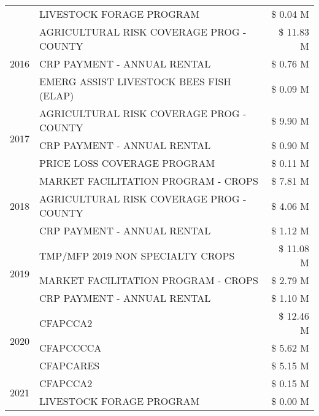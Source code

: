 \begin{tabular}{llr}
 & LIVESTOCK FORAGE PROGRAM & \$ 0.04 M \\
\cline{1-3}
\multirow[t]{3}{*}{2016} & AGRICULTURAL RISK COVERAGE PROG - COUNTY & \$ 11.83 M \\
 & CRP PAYMENT - ANNUAL RENTAL & \$ 0.76 M \\
 & EMERG ASSIST LIVESTOCK BEES FISH (ELAP) & \$ 0.09 M \\
\cline{1-3}
\multirow[t]{3}{*}{2017} & AGRICULTURAL RISK COVERAGE PROG - COUNTY & \$ 9.90 M \\
 & CRP PAYMENT - ANNUAL RENTAL & \$ 0.90 M \\
 & PRICE LOSS COVERAGE PROGRAM & \$ 0.11 M \\
\cline{1-3}
\multirow[t]{3}{*}{2018} & MARKET FACILITATION PROGRAM - CROPS & \$ 7.81 M \\
 & AGRICULTURAL RISK COVERAGE PROG - COUNTY & \$ 4.06 M \\
 & CRP PAYMENT - ANNUAL RENTAL & \$ 1.12 M \\
\cline{1-3}
\multirow[t]{3}{*}{2019} & TMP/MFP 2019 NON SPECIALTY CROPS & \$ 11.08 M \\
 & MARKET FACILITATION PROGRAM - CROPS & \$ 2.79 M \\
 & CRP PAYMENT - ANNUAL RENTAL & \$ 1.10 M \\
\cline{1-3}
\multirow[t]{3}{*}{2020} & CFAPCCA2 & \$ 12.46 M \\
 & CFAPCCCCA & \$ 5.62 M \\
 & CFAPCARES & \$ 5.15 M \\
\cline{1-3}
\multirow[t]{2}{*}{2021} & CFAPCCA2 & \$ 0.15 M \\
 & LIVESTOCK FORAGE PROGRAM & \$ 0.00 M \\
\cline{1-3}
\bottomrule
\end{tabular}
